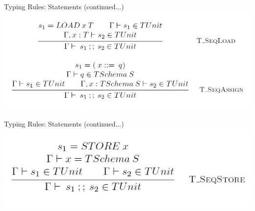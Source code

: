 \begin{frame}{Typing Rules: Statements (continued...)}
\centering
%
\includegraphics[scale=0.4]{Images/TypingRules/SEQ1.JPG}
\end{frame}

\begin{frame}{Typing Rules: Statements (continued...)}
\centering
\includegraphics[scale=0.4]{Images/TypingRules/SEQ2.JPG}
\end{frame}

